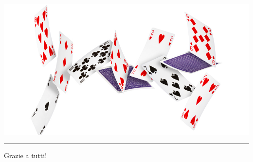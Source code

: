 \documentclass[10pt]{beamer}	%
\theoremstyle{definition}
\theoremstyle{plain}
\begin{document}
\begin{frame}
	
	\begin{center}
		\vspace{-0.8cm}
		{\includegraphics[scale=0.3]{./Images/cards.jpg}}
		\vspace{-8cm}
		{\textcolor{white}{\rule{\paperwidth}{\paperheight}}}
	\end{center}
	\vspace{-5cm}	
	
	\centering
	\Huge{
	Grazie a tutti!}
\end{frame}
%
%	
%	
\end{document}
